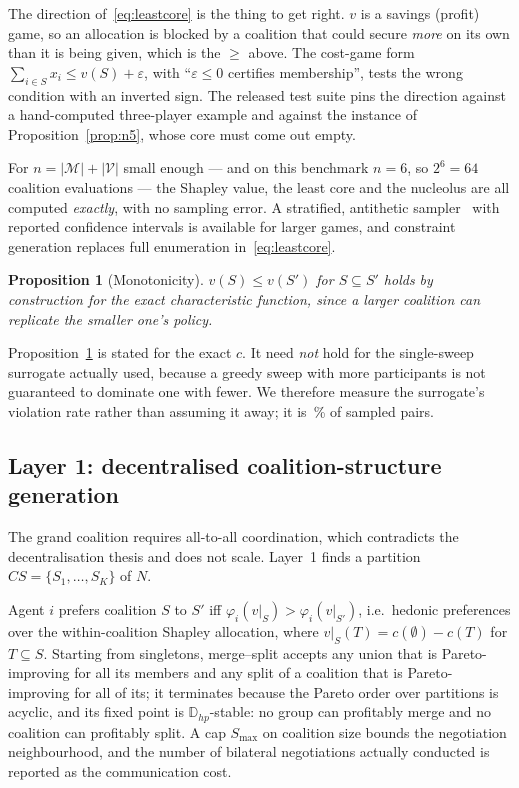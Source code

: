 \documentclass[preprint, 3p, review, 12pt]{elsarticle}
\newtheorem{proposition}[theorem]{Proposition}
\theoremstyle{definition}
\begin{document}
The direction of~\eqref{eq:leastcore} is the thing to get right. $v$ is a savings (profit)
game, so an allocation is blocked by a coalition that could secure \emph{more} on its own
than it is being given, which is the $\ge$ above. The cost-game form
$\sum_{i\in S}x_i \le v(S)+\varepsilon$, with ``$\varepsilon\le0$ certifies membership'',
tests the wrong condition with an inverted sign. The released test suite pins the direction
against a hand-computed three-player example and against the instance of
Proposition~\ref{prop:n5}, whose core must come out empty.

For $n=|\mathcal{M}|+|\mathcal{V}|$ small enough --- and on this benchmark $n=6$, so
$2^{6}=64$ coalition evaluations --- the Shapley value, the least core and the nucleolus are
all computed \emph{exactly}, with no sampling error. A stratified, antithetic
sampler~\citep{castro2009polynomial} with reported confidence intervals is available for
larger games, and constraint generation replaces full enumeration in~\eqref{eq:leastcore}.

\begin{proposition}[Monotonicity]
\label{prop:t6}
$v(S)\le v(S')$ for $S\subseteq S'$ holds by construction for the exact characteristic
function, since a larger coalition can replicate the smaller one's policy.
\end{proposition}

Proposition~\ref{prop:t6} is stated for the exact $c$. It need \emph{not} hold for the
single-sweep surrogate actually used, because a greedy sweep with more participants is not
guaranteed to dominate one with fewer. We therefore measure the surrogate's violation rate
rather than assuming it away; it is \,\% of sampled pairs.

\subsection{Layer 1: decentralised coalition-structure generation}
\label{sec:layer1}

The grand coalition requires all-to-all coordination, which contradicts the decentralisation
thesis and does not scale. Layer~1 finds a partition $CS=\{S_1,\dots,S_K\}$ of $N$.

Agent $i$ prefers coalition $S$ to $S'$ iff $\varphi_i(v|_S) > \varphi_i(v|_{S'})$, i.e.\
hedonic preferences over the within-coalition Shapley allocation, where
$v|_S(T)=c(\emptyset)-c(T)$ for $T\subseteq S$. Starting from singletons, merge--split
\citep{apt2009stable, saad2009coalitional} accepts any union that is Pareto-improving for all
its members and any split of a coalition that is Pareto-improving for all of its; it
terminates because the Pareto order over partitions is acyclic, and its fixed point is
$\mathbb{D}_{hp}$-stable: no group can profitably merge and no coalition can profitably split.
A cap $S_{\max}$ on coalition size bounds the negotiation neighbourhood, and the number of
bilateral negotiations actually conducted is reported as the communication cost.
\end{document}
